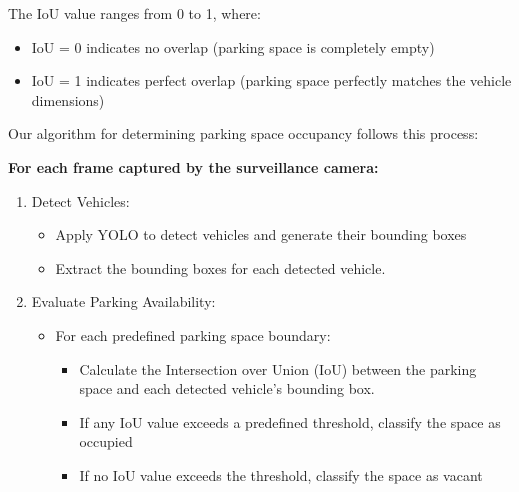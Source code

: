 The IoU value ranges from 0 to 1, where:
\begin{itemize}
    \item IoU = 0 indicates no overlap (parking space is completely empty)
    \item IoU = 1 indicates perfect overlap (parking space perfectly matches the vehicle dimensions)
\end{itemize}

Our algorithm for determining parking space occupancy follows this process:

\noindent \textbf {For each frame captured by the surveillance camera:}
\begin{enumerate}
    \item Detect Vehicles:
    \begin{itemize}
        \item Apply YOLO to detect vehicles and generate their bounding boxes
        \item Extract the bounding boxes for each detected vehicle.
    \end{itemize}
    \item Evaluate Parking Availability:
    \begin{itemize}
        \item For each predefined parking space boundary:
        \begin{itemize}
            \item Calculate the Intersection over Union (IoU) between the parking space and each detected vehicle's bounding box.
            \item If any IoU value exceeds a predefined threshold, classify the
space as occupied
            \item If no IoU value exceeds the threshold, classify the space as
vacant
        \end{itemize}
    \end{itemize}
\end{enumerate}
    
